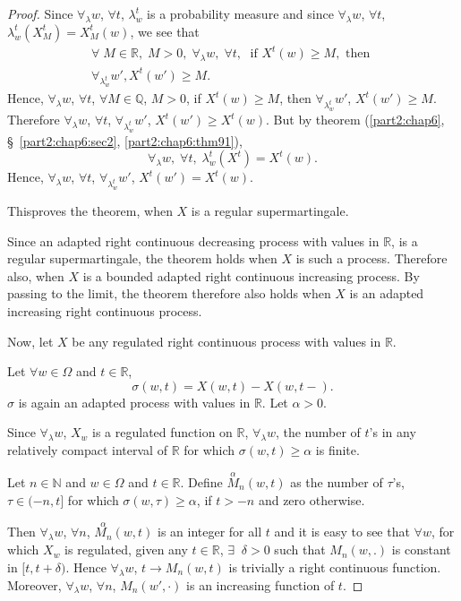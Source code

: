 \begin{proof}
Since $\forall_\lambda w$, $\forall t$, $\lambda^t_w$ is a probability
measure and since $\forall_\lambda w$, $\forall t$,\break
$\lambda^t_w(X^t_M) = X^t_M(w)$, we see that 
\begin{gather*}
\forall \; M \in \mathbb{R}, \; M>0, \; \forall_\lambda w, \; \forall
t, \; \text{ if } X^t(w) \geq M, \text{ then } \\
\forall_{\lambda^t_w} w', X^t(w') \geq M.
\end{gather*}
Hence, $\forall_\lambda w$, $\forall t$, $\forall M \in\mathbb{Q}$,
$M>0$, if $X^t(w) \geq M$, then $\forall_{\lambda^t_w} w'$, $X^t(w')
\geq M $. Therefore $\forall_\lambda w$, $\forall t$,
$\forall_{\lambda^t_w} w'$, $X^t(w') \geq X^t(w)$. But by theorem (\ref{part2:chap6},
\S\ \ref{part2:chap6:sec2}, \ref{part2:chap6:thm91}), 
$$
\forall_\lambda w, \; \forall t, \; \lambda^t_w(X^t) = X^t(w). 
$$
Hence, $\forall_\lambda w$, $\forall t$, $\forall_{\lambda^t_w} w'$,
$X^t (w') = X^t(w)$. 

This\pageoriginale proves the theorem, when $X$ is a regular
supermartingale. 

Since an adapted right continuous decreasing process with values in
$\mathbb{R}$, is a regular supermartingale, the theorem holds when $X$
is such a process. Therefore also, when $X$ is a bounded adapted right
continuous increasing process. By passing to the limit, the theorem
therefore also holds when $X$ is an adapted increasing right
continuous process. 

Now, let $X$ be any regulated right continuous process with values in
$\mathbb{R}$. 

Let $\forall w \in \Omega$ and $t \in \mathbb{R}$,
$$
\sigma (w,t) = X(w,t) - X (w, t-).
$$
$\sigma$ is again an adapted process with values in $\mathbb{R}$. Let
$\alpha >0$.

Since $\forall_\lambda w$, $X_w$ is a regulated function on
$\mathbb{R}$, $\forall_\lambda w$, the number of $t$'s in any
relatively compact interval of $\mathbb{R}$ for which $\sigma (w,t)
\geq \alpha$ is finite.

Let $n \in \mathbb{N}$ and $w \in \Omega$ and $t \in
\mathbb{R}$. Define $\overset{\alpha}{M}_n (w,t)$ as the number of
$\tau$'s, $\tau \in (-n, t]$ for which $\sigma (w, \tau) \geq \alpha$,
if  $t > -n$ and zero otherwise.

Then $\forall_\lambda w$, $\forall n$, $\overset{\alpha}{M_n} (w,t)$
is an integer for all $t$ and it is easy to see that $\forall w$, for
which $X_w$ is regulated, given any $t \in \mathbb{R}$, $\exists \;\; 
\delta >0$ such that $M_n(w,.)$ is constant in $[t, t +
  \delta)$. Hence $\forall_\lambda w$, $t \to M_n(w,t)$ is trivially a
  right continuous function. Moreover, $\forall_\lambda w$, $\forall
  n$, $M_n(w', \cdot)$ is an increasing function of $t$. 


\end{proof}
